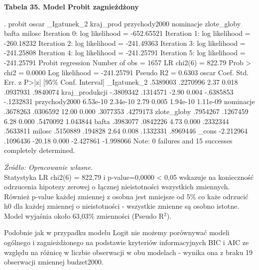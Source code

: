 \vspace{0.5cm}
\textbf{Tabela 35. Model Probit zagnieżdżony}
\begin{stlog}
. probit oscar _Igatunek_2 kraj_prod przychody2000 nominacje zlote_globy bafta milosc
{\smallskip}
Iteration 0:   log likelihood = -652.65521  
Iteration 1:   log likelihood = -260.18232  
Iteration 2:   log likelihood = -241.49363  
Iteration 3:   log likelihood = -241.25808  
Iteration 4:   log likelihood = -241.25791  
Iteration 5:   log likelihood = -241.25791  
{\smallskip}
Probit regression                                 Number of obs   =       1657
                                                  LR chi2(6)      =     822.79
                                                  Prob > chi2     =     0.0000
Log likelihood = -241.25791                       Pseudo R2       =     0.6303
{\smallskip}
         oscar {\VBAR}      Coef.   Std. Err.      z    P>|z|     [95\% Conf. Interval]
   _Igatunek_2 {\VBAR}   .5389003   .2270996     2.37   0.018     .0937931    .9840074
kraj_produkcji {\VBAR}  -.3809342   .1314571    -2.90   0.004    -.6385853   -.1232831
 przychody2000 {\VBAR}   6.53e-10   2.34e-10     2.79   0.005     1.94e-10    1.11e-09
     nominacje {\VBAR}   .3678263   .0306592    12.00   0.000     .3077353    .4279173
   zlote_globy {\VBAR}   .7954267   .1267459     6.28   0.000     .5470092    1.043844
         bafta {\VBAR}   .3983077   .0842226     4.73   0.000     .2332344    .5633811
        milosc {\VBAR}   .5150889    .194828     2.64   0.008     .1332331    .8969446
         _cons {\VBAR}  -2.212964   .1096436   -20.18   0.000    -2.427861   -1.998066
Note: 0 failures and 15 successes completely determined.
\end{stlog}
\textit{\footnotesize{Źródło: Opracowanie własne.}} \\

Statystyka LR chi2(6) = 822,79 i p-value=0,0000 < 0,05 wskazuje na konieczność odrzucenia hipotezy zerowej o łącznej nieistotności wszystkich zmiennych. Również p-value każdej zmiennej z osobna jest mniejsze od 5\% co każe odrzucić h0 dla każdej zmiennej o nieistotności - wszystkie zmienne są osobno istotne. Model wyjaśnia około 63,03\% zmienności (Pseudo R$^{2}$). 

Podobnie jak w przypadku modelu Logit nie możemy porównywać modeli ogólnego i zagnieżdżonego na podstawie kryteriów informacyjnych BIC i AIC ze względu na różnicę w liczbie obserwacji w obu modelach - wynika ona z braku 19 obserwacji zmiennej budzet2000.

